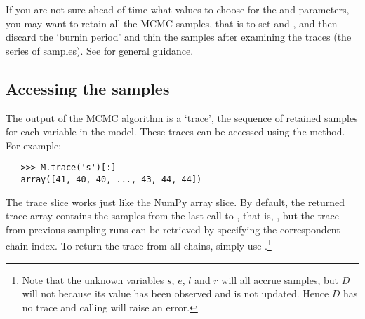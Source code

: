 If you are not sure ahead of time what values to choose for the  and  parameters, you may want to retain all the MCMC samples, that is to set  and , and then discard the `burnin period' and thin the samples after examining the traces (the series of samples). See \cite{gelman} for general guidance.

\subsection{Accessing the samples}
The output of the MCMC algorithm is a `trace', the sequence of retained
samples for each variable in the model. These traces can be accessed
using the  method. For example:
\begin{verbatim}
   >>> M.trace('s')[:]
   array([41, 40, 40, ..., 43, 44, 44])
\end{verbatim}
The trace slice  works just like the NumPy array
slice. By default, the returned trace array contains the samples from the
last call to , that is, , but the trace from
previous sampling runs can be retrieved by specifying the correspondent
chain index. To return the trace from all chains, simply use
.\footnote{Note that the unknown variables $s$, $e$, $l$ and $r$ will all
accrue samples, but $D$ will not because its value has been observed and is
not updated. Hence $D$ has no trace and calling  will
raise an error. }


